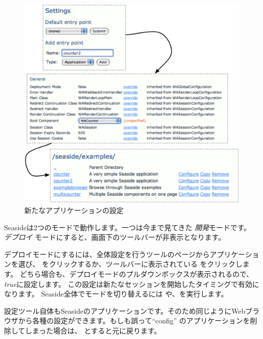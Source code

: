 \documentclass[a4paper,10pt,twoside]{book}
\begin{document}
\begin{figure}[ht]
\begin{center}
\includegraphics[width=\textwidth]{counter2}
\caption{新たなアプリケーションの設定}
\end{center}
\end{figure}

Seasideは2つのモードで動作します。一つは今まで見てきた \emph{開発}モードです。 \emph{デプロイ} モードにすると、画面下のツールバーが非表示となります。

デプロイモードにするには、全体設定を行うツールのページからアプリケーションを選び、  をクリックするか、ツールバーに表示されている  をクリックします。
どちら場合も、デプロイモードのプルダウンボックスが表示されるので、\emph{true}に設定します。
この設定は新たなセッションを開始したタイミングで有効になります。
Seaside全体でモードを切り替えるには や、を実行します。

設定ツール自体もSeasideのアプリケーションです。そのため同じようにWebブラウザから各種の設定ができます。もしも誤って``config'' のアプリケーションを削除してしまった場合は、
  とすると元に戻ります。
\end{document}
